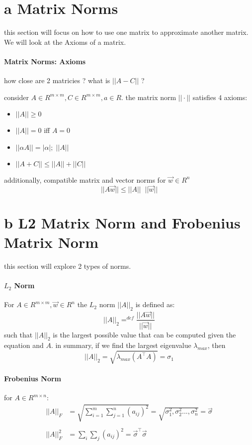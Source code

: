 \documentclass[12pt]{book}
\title{\coursetitle\linebreak\lecturename}
\author{\\Cain Susko\\ 
           \\ \\ \\
      Queen's University 
    \\School of Computing\\}
\begin{document}
\begin{titlepage}
        \maketitle
\end{titlepage}


\section*{a Matrix Norms}
this section will focus on how to use one matrix to approximate another matrix.
We will look at the Axioms of a matrix.

\paragraph{Matrix Norms: Axioms}
how close are 2 matricies ? what is $|| A - C ||$ ?

consider $A\in R^{m\times m}, C \in R^{m\times m}, a\in R$.
the matrix norm $||\cdot||$ satisfies 4 axioms:
\begin{itemize}
        \item $||A||\geq 0$
        \item $||A|| = 0$ iff $A=0$
        \item $||\alpha A|| = |\alpha|;\;||A||$
        \item $||A+C|| \leq ||A|| + ||C||$
\end{itemize}

additionally, compatible matrix and vector norms for $\vec w \in R^n$
\[||A\vec w|| \leq ||A||\;\; ||\vec w||\]

\section*{b L2 Matrix Norm and Frobenius Matrix Norm}
this section will explore 2 types of norms.

\paragraph{$L_2$ Norm}
For $A\in R^{m\times m}, \vec w \in R^n$ the $L_2$ norm $||A||_2$ is defined as:
\[||A||_2 =^{def} \frac{||A\vec w||}{||\vec w||}\]
such that $||A||_2$ is the largest possible value that can be computed given the equation and $A$.
in summary, if we find the largest eigenvalue $\lambda_{max}$, then
\[||A||_2 = \sqrt{\lambda_{max}(A^\top A)} = \sigma_1\]

\paragraph{Frobenius Norm}
for $A\in R^{m\times n}$:\\
\begin{align*}
        ||A||_F &= \sqrt{\sum^m_{i=1}\sum^n_{j=1} (a_{ij})^2} = \sqrt{\sigma^2_1, \sigma^2_2...
        ,\sigma^2_n} = \vec\sigma\\
        \\
        ||A||^2_F &= \sum_i \sum_j (a_{ij})^2 = \vec\sigma^\top \vec\sigma\\
\end{align*}
\end{document}
